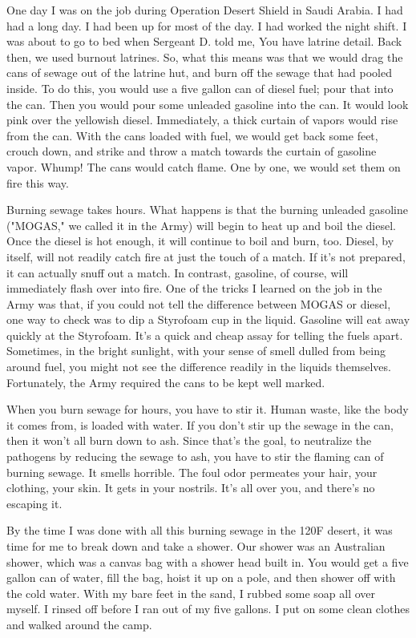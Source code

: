 One day I was on the job during Operation Desert Shield in Saudi Arabia.  I had had a long day.  I had been up for most of the day.  I had worked the night shift.  I was about to go to bed when Sergeant D. told me, You have latrine detail.  Back then, we used burnout latrines.  So, what this means was that we would drag the cans of sewage out of the latrine hut, and burn off the sewage that had pooled inside.  To do this, you would use a five gallon can of diesel fuel; pour that into the can.  Then you would pour some unleaded gasoline into the can.  It would look pink over the yellowish diesel.  Immediately, a thick curtain of vapors would rise from the can.  With the cans loaded with fuel, we would get back some feet, crouch down, and strike and throw a match towards the curtain of gasoline vapor.  Whump!  The cans would catch flame.  One by one, we would set them on fire this way.

Burning sewage takes hours.  What happens is that the burning unleaded gasoline ("MOGAS," we called it in the Army) will begin to heat up and boil the diesel.  Once the diesel is hot enough, it will continue to boil and burn, too.  Diesel, by itself, will not readily catch fire at just the touch of a match.  If it's not prepared, it can actually snuff out a match.  In contrast, gasoline, of course, will immediately flash over into fire.  One of the tricks I learned on the job in the Army was that, if you could not tell the difference between MOGAS or diesel, one way to check was to dip a Styrofoam cup in the liquid.  Gasoline will eat away quickly at the Styrofoam.  It's a quick and cheap assay for telling the fuels apart.  Sometimes, in the bright sunlight, with your sense of smell dulled from being around fuel, you might not see the difference readily in the liquids themselves.  Fortunately, the Army required the cans to be kept well marked.

When you burn sewage for hours, you have to stir it.  Human waste, like the body it comes from, is loaded with water.  If you don't stir up the sewage in the can, then it won't all burn down to ash.  Since that's the goal, to neutralize the pathogens by reducing the sewage to ash, you have to stir the flaming can of burning sewage.  It smells horrible.  The foul odor permeates your hair, your clothing, your skin.  It gets in your nostrils.  It's all over you, and there's no escaping it.

By the time I was done with all this burning sewage in the 120F desert, it was time for me to break down and take a shower.  Our shower was an Australian shower, which was a canvas bag with a shower head built in.  You would get a five gallon can of water, fill the bag, hoist it up on a pole, and then shower off with the cold water.  With my bare feet in the sand, I rubbed some soap all over myself.  I rinsed off before I ran out of my five gallons.  I put on some clean clothes and walked around the camp.

